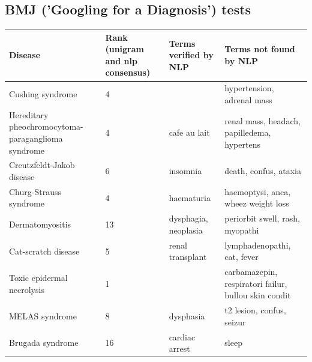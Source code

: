 \documentclass[10pt,letterpaper,final]{article}
\begin{document}
\subsection{BMJ ('Googling for a Diagnosis') tests }
\label{app:bmj_tfidf_tfidfrecalc}
\begin{center}
\begin{small}
	\begin{longtable}{|p{3.5cm}|p{1.5cm}|p{3cm}|p{3cm}|}
	\hline
	\textbf{Disease}  & \textbf{Rank (unigram and nlp consensus)} & \textbf{Terms verified by NLP}  & \textbf{Terms not found by NLP} \\
	\hline\hline
Cushing syndrome & 4 &  & hypertension, adrenal mass \\ \hline
Hereditary pheochromocytoma-paraganglioma syndrome & 4 & cafe au lait & renal mass, headach, papilledema, hypertens \\ \hline
Creutzfeldt-Jakob disease & 6 & insomnia & death, confus, ataxia \\ \hline
Churg-Strauss syndrome & 4 & haematuria &  haemoptysi, anca, wheez weight loss \\ \hline
Dermatomyositis & 13 & dysphagia, neoplasia & periorbit swell, rash, myopathi \\ \hline
Cat-scratch disease & 5 & renal transplant & lymphadenopathi, cat, fever \\ \hline
Toxic epidermal necrolysis & 1 &  & carbamazepin, respiratori failur, bullou skin condit \\ \hline
MELAS syndrome & 8 & dysphasia & t2 lesion, confus, seizur \\ \hline
Brugada syndrome & 16 & cardiac arrest & sleep \\ \hline
	\end{longtable}
\end{small}
\end{center}
\end{document}
